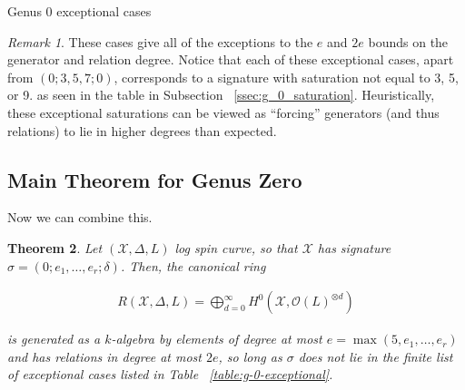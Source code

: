 \documentclass{amsart}
\theoremstyle{plain}
\newtheorem{thm}{Theorem}[section]
\theoremstyle{definition}
\theoremstyle{remark}
\newtheorem{rem}[thm]{Remark}
\numberwithin{equation}{section}
\newcommand\ssec{\subsection}
\newcommand \sx{\mathscr X}
\newcommand\sco{{\mathscr O}}
\newcommand \halfcan{L}
\begin{document}
\begin{center}
\label{table:g-0-exceptional}
Genus 0 exceptional cases
\end{center}

\begin{rem}
These cases give all of the exceptions to the $e$ and $2e$ bounds on
the generator and relation degree. Notice that each of these
exceptional cases, apart from $(0; 3, 5, 7; 0)$, corresponds to a
signature with saturation not equal to
3, 5, or 9. as seen in the table in Subsection
~\ref{ssec:g_0_saturation}. Heuristically, these exceptional saturations can be viewed as
``forcing'' generators (and thus relations) to lie in higher degrees than
expected.
\end{rem}

\ssec{Main Theorem for Genus Zero}
\label{ssec:g-0-main}
Now we can combine this.

\begin{thm}
\label{thm:g-0-main}
Let $(\sx, \Delta, \halfcan)$ log spin curve,
so that $\sx$ has signature $\sigma = (0; e_1, \ldots, e_r; \delta)$.
Then, the canonical ring

\begin{align*}
	R(\sx, \Delta, \halfcan) = \bigoplus_{d = 0}^\infty H^0(\sx, \sco(L)^{\otimes d})
\end{align*}

\noindent
is generated as a $k$-algebra by elements of degree at most $e =
\max(5, e_1, \ldots, e_r)$ and has relations in degree at most $2e$,
so long as $\sigma$ does not lie in the finite list of exceptional
cases listed in Table ~\ref{table:g-0-exceptional}.
\end{thm}
\end{document}
